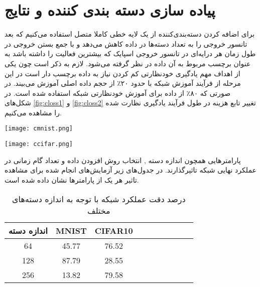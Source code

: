 \section{  پیاده سازی دسته بندی کننده و نتایج }

برای اضافه کردن دسته‌بندی‌کننده از یک لایه خطی کاملا متصل استفاده می‌کنیم که بعد تانسور خروجی را به تعداد دسته‌ها در داده کاهش می‌دهد و با جمع بستن خروجی در طول زمان هر درایه‌ای در تانسور خروجی اسپایک که بیشترین فعالیت را داشته باشد به عنوان برچسب مربوط به آن داده در نظر گرفته می‌شود. لازم به ذکر است چون یکی از اهداف مهم یادگیری خودنظارتی کم کردن نیاز به داده برچسب دار است در این مرحله از فرآیند آموزش شبکه با حدود ۲۰٪ از حجم داده اصلی آموزش می‌بیند. در صورتی که ۸۰٪ از داده برای آموزش خودنظارتی شبکه استفاده شده است.
در شکل‌های \ref{fig:closs1} و  \ref{fig:closs2}  تغییر تابع هزینه در طول فرآیند یادگیری نظارت شده را مشاهده می‌کنیم.


\begin{minipage}{0.49\linewidth}
	\centering
	\texttt{[image: cmnist.png]}
	\captionsetup{font=small} %
	\label{fig:closs1}
\end{minipage}
\begin{minipage}{0.49\linewidth}
	\centering
	\texttt{[image: ccifar.png]}
	\captionsetup{font=small} %
	\label{fig:closs2}
	
\end{minipage}

پارامترهایی همچون اندازه دسته , انتخاب روش افزودن داده و تعداد گام زمانی در عملکرد نهایی شبکه تاثیرگذارند. در جدول‌های زیر آزمایش‌های انجام شده برای مشاهده تاثیر هر یک از پارامتر‌ها نشان داده شده است. 





\begin{table}[h!]
	\centering
	\begin{tabular}{|c |c c| rrrrrrr}
			\hline
		اندازه دسته & MNIST & CIFAR10    \\ 
		\hline
		64   & 45.77    &76.52     \\
		128    & 87.79     & 28.55      \\
		256   & 13.82     & 79.58         \\
		\hline
		
	\end{tabular}
	\captionsetup{font=small} %
	\caption{ درصد دقت عملکرد شبکه با توجه به اندازه دسته‌های مختلف}
\end{table}



